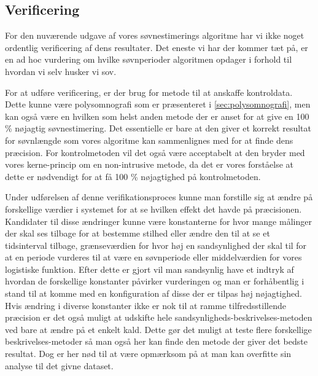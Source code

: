 \subsection{Verificering}
For den nuværende udgave af vores søvnestimerings algoritme har vi ikke noget ordentlig verificering af dens resultater.
Det eneste vi har der kommer tæt på, er en ad hoc vurdering om hvilke søvnperioder algoritmen opdager i forhold til hvordan vi selv husker vi sov.

For at udføre verificering, er der brug for metode til at anskaffe kontroldata.
Dette kunne være polysomnografi som er præsenteret i \cref{sec:polysomnografi}, men kan også være en hvilken som helst anden metode der er anset for at give en 100 \% nøjagtig søvnestimering.
Det essentielle er bare at den giver et korrekt resultat for søvnlængde som vores algoritme kan sammenlignes med for at finde dens præcision.
For kontrolmetoden vil det også være acceptabelt at den bryder med vores kerne-princip om en non-intrusive metode, da det er vores forståelse at dette er nødvendigt for at få 100 \% nøjagtighed på kontrolmetoden.

Under udførelsen af denne verifikationsproces kunne man forstille sig at ændre på forskellige værdier i systemet for at se hvilken effekt det havde på præcisionen.
Kandidater til disse ændringer kunne være konstanterne for hvor mange målinger der skal ses tilbage for at bestemme stilhed eller ændre den til at se et tidsinterval tilbage, grænseværdien for hvor høj en sandsynlighed der skal til for at en periode vurderes til at være en søvnperiode eller middelværdien for vores logistiske funktion.
Efter dette er gjort vil man sandsynlig have et indtryk af hvordan de forskellige konstanter påvirker vurderingen og man er forhåbentlig i stand til at komme med en konfiguration af disse der er tilpas høj nøjagtighed.
Hvis ændring i diverse konstanter ikke er nok til at ramme tilfredsstillende præcision er det også muligt at udskifte hele sandsynligheds-beskrivelses-metoden ved bare at ændre på et enkelt kald.
Dette gør det muligt at teste flere forskellige beskrivelses-metoder så man også her kan finde den metode der giver det bedste resultat.
Dog er her nød til at være opmærksom på at man kan overfitte sin analyse til det givne dataset.
